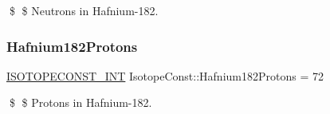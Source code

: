 \$ \$ Neutrons in Hafnium-\/182. \mbox{\label{group___isotope_const-_hafnium-_hf182_gad764ab6a912fa7320615e8014174d224}} 
\subsubsection{\texorpdfstring{Hafnium182\+Protons}{Hafnium182Protons}}
{\footnotesize\ttfamily \mbox{\hyperlink{group___isotope_const-_macros_ga5f18360b3e99483a35c32d789e62621c}{I\+S\+O\+T\+O\+P\+E\+C\+O\+N\+S\+T\+\_\+\+I\+NT}} Isotope\+Const\+::\+Hafnium182\+Protons = 72}

\$ \$ Protons in Hafnium-\/182. 